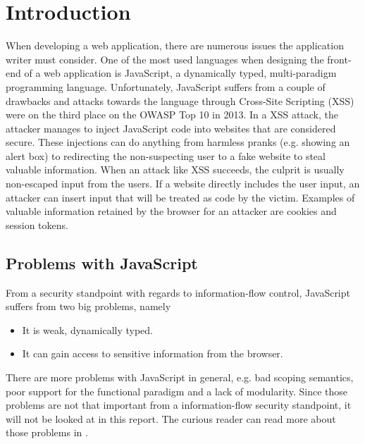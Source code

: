 \section{Introduction}
\label{chapter:intro}
When developing a web application, there are numerous issues the application writer must consider. One of the most used languages when designing the front-end of a web application is JavaScript\cite{javascript_popularity}, a dynamically typed, multi-paradigm programming language.\cite{javascript_info} Unfortunately, JavaScript suffers from a couple of drawbacks and attacks towards the language through Cross-Site Scripting (XSS) were on the third place on the OWASP Top 10 in 2013.\cite{owasp_xss_rank} In a XSS attack, the attacker manages to inject JavaScript code into websites that are considered secure.\cite{owasp_xss, excess_xss} These injections can do anything from harmless pranks (e.g. showing an alert box) to redirecting the non-suspecting user to a fake website to steal valuable information. When an attack like XSS succeeds, the culprit is usually non-escaped input from the users. If a website directly includes the user input, an attacker can insert input that will be treated as code by the victim.\cite{excess_xss} Examples of valuable information retained by the browser for an attacker are cookies and session tokens.
\subsection{Problems with JavaScript}
From a security standpoint with regards to information-flow control, JavaScript suffers from two big problems, namely
\begin{itemize}
  \item It is weak, dynamically typed.
  \item It can gain access to sensitive information from the browser.
\end{itemize}
There are more problems with JavaScript in general, e.g. bad scoping semantics, poor support for the functional paradigm and a lack of modularity. Since those problems are not that important from a information-flow security standpoint, it will not be looked at in this report. The curious reader can read more about those problems in \cite{haste-lang}.

